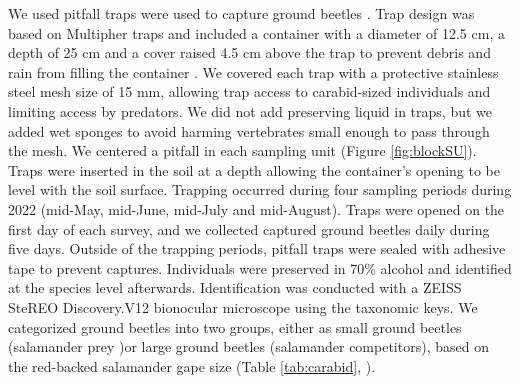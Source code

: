 We used pitfall traps were used to capture ground beetles \citep{baarsCatchesPitfallTraps1979,spenceSamplingCarabidAssemblages1994a,loveiEcologyBehaviorGround1996,kotzeFortyYearsCarabid2011a,knappEffectPitfallTrap2012}. 
Trap design was based on Multipher\up{\textregistered{}} traps and included a container with a diameter of 12.5 cm, a depth of 25 cm and a cover raised 4.5 cm above the trap 
to prevent debris and rain from filling the container \citep{Jobin1988MultiPherinsect,mooreEffectsTwoSilvicultural2004,bouchardBeetleCommunityResponse2016b}. 
We covered each trap with a protective stainless steel mesh size of 15 mm, allowing trap access to carabid-sized individuals and limiting access by predators.  
We did not add preserving liquid in traps, but we added wet sponges to avoid harming vertebrates small enough to pass through the mesh. 
We centered a pitfall in each sampling unit (Figure \ref{fig:blockSU}). 
Traps were inserted in the soil at a depth allowing the container’s opening to be level with the soil surface. 
Trapping occurred during four sampling periods during 2022 (mid-May, mid-June, mid-July and mid-August). 
Traps were opened on the first day of each survey, and we collected captured ground beetles daily during five days. 
Outside of the trapping periods, pitfall traps were sealed with adhesive tape to prevent captures. 
Individuals were preserved in 70\% alcohol and identified at the species level afterwards. 
Identification was conducted with a ZEISS SteREO Discovery.V12 bionocular microscope using the \cite{larochelleManuelIdentificationCarabidae1976} taxonomic keys. 
We categorized ground beetles into two groups, either as small ground beetles (salamander prey )or large ground beetles (salamander competitors), based on the red-backed salamander gape size (Table \ref{tab:carabid}, \citealp{jaegerFoodLimitedResource1972,magliaModulationPreycaptureBehavior1995,magliaOntogenyFeedingEcology1996}).

